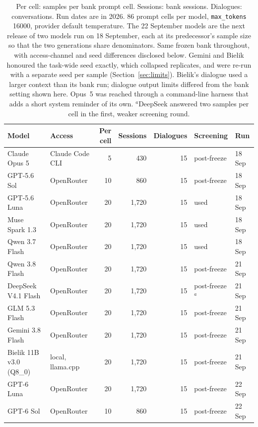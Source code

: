 \documentclass[11pt]{article}
\begin{document}
\begin{table}[ht]
\centering
\small
\begin{tabular}{llrrrll}
\toprule
Model & Access & Per cell & Sessions & Dialogues & Screening & Run \\
\midrule
Claude Opus 5 & Claude Code CLI & 5 & 430 & 15 & post-freeze & 18 Sep \\
GPT-5.6 Sol & OpenRouter & 10 & 860 & 15 & post-freeze & 18 Sep \\
GPT-5.6 Luna & OpenRouter & 20 & 1{,}720 & 15 & used & 18 Sep \\
Muse Spark 1.3 & OpenRouter & 20 & 1{,}720 & 15 & used & 18 Sep \\
Qwen 3.7 Flash & OpenRouter & 20 & 1{,}720 & 15 & used & 18 Sep \\
\midrule
Qwen 3.8 Flash & OpenRouter & 20 & 1{,}720 & 15 & post-freeze & 21 Sep \\
DeepSeek V4.1 Flash & OpenRouter & 20 & 1{,}720 & 15 & post-freeze$^{a}$ & 21 Sep \\
GLM 5.3 Flash & OpenRouter & 20 & 1{,}720 & 15 & post-freeze & 21 Sep \\
Gemini 3.8 Flash & OpenRouter & 20 & 1{,}720 & 15 & post-freeze & 21 Sep \\
Bielik 11B v3.0 (Q8\_0) & local, llama.cpp & 20 & 1{,}720 & 15 & post-freeze & 21 Sep \\
\midrule
GPT-6 Luna & OpenRouter & 20 & 1{,}720 & 15 & post-freeze & 22 Sep \\
GPT-6 Sol & OpenRouter & 10 & 860 & 15 & post-freeze & 22 Sep \\
\bottomrule
\end{tabular}
\caption{Per cell: samples per bank prompt cell. Sessions: bank sessions. Dialogues: conversations. Run dates are in 2026. 86 prompt cells per model, \texttt{max\_tokens} 16000, provider
default temperature. The 22 September models are the next release of two models run on 18
September, each at its predecessor's sample size so that the two generations share denominators. Same frozen bank throughout, with access-channel and
seed differences disclosed below. Gemini and
Bielik honoured the task-wide seed exactly, which collapsed replicates, and were re-run with a
separate seed per sample (Section~\ref{sec:limits}). Bielik's dialogue used a larger context than
its bank run; dialogue output limits differed from the bank setting shown here. Opus~5 was reached through a command-line
harness that adds a short system reminder of its own. $^{a}$DeepSeek answered two samples per
cell in the first, weaker screening round.}
\label{tab:setup}
\end{table}
\end{document}
